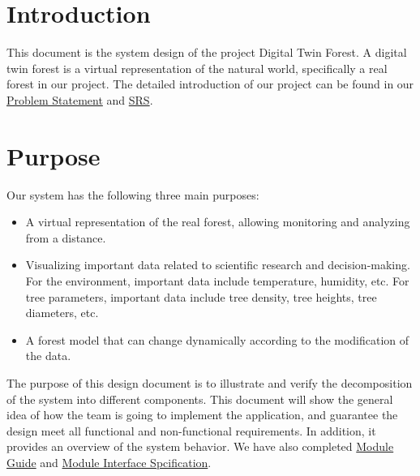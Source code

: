 \documentclass[12pt, titlepage]{article}
\begin{document}
\newpage

\tableofcontents

\newpage

\listoftables

\listoffigures

\newpage


\section{Introduction}

This document is the system design of the project Digital
Twin Forest. A digital twin forest is a virtual 
representation of the natural world, specifically a real 
forest in our project. The detailed introduction of our
project can be found in our \href{https://github.com/wuj187/DigitalTwinCAS/blob/main/docs/ProblemStatementAndGoals/ProblemStatement.pdf}{Problem Statement} and \href{https://github.com/wuj187/DigitalTwinCAS/blob/main/docs/SRS/SRS.pdf}{SRS}.

\section{Purpose}

Our system has the following three main purposes:
\begin{itemize}
\item A virtual representation of the real forest,
allowing monitoring and analyzing from a distance.
\item Visualizing important data related to scientific 
research and decision-making. For the environment, 
important data include temperature, humidity, etc. 
For tree parameters, important data include tree density,
tree heights, tree diameters, etc.
\item A forest model that can change dynamically 
according to the modification of the data.
\end{itemize}

\noindent The purpose of this design document is to
illustrate and verify the decomposition of the system 
into different components. This document will show 
the general idea of how the team is going to 
implement the application, and guarantee the design
meet all functional and non-functional requirements. 
In addition, it provides an overview of the system behavior. We have also completed  \href{https://github.com/wuj187/DigitalTwinCAS/blob/main/docs/Design/MG/MG.pdf}{Module Guide} and  \href{https://github.com/wuj187/DigitalTwinCAS/blob/main/docs/Design/MIS/MIS.pdf}{Module Interface 
Spcification}.
\end{document}
